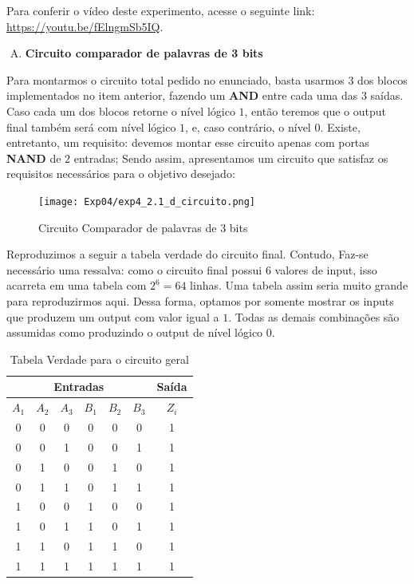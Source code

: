 \documentclass[12pt]{article}
\begin{document}
Para conferir o vídeo deste experimento, acesse o seguinte link:
\href{https://youtu.be/fElngmSb5IQ}{https://youtu.be/fElngmSb5IQ}.

\begin{enumerate}[D)]
\item \textbf{Circuito comparador de palavras de 3 bits}
\end{enumerate}

Para montarmos o circuito total pedido no enunciado, basta usarmos $3$ dos
blocos implementados no item anterior, fazendo um \textbf{AND} entre cada uma
das $3$ saídas. Caso cada um dos blocos retorne o nível lógico $1$, então
teremos que o output final também será com nível lógico $1$, e, caso contrário,
o nível $0$. Existe, entretanto, um requisito: devemos montar esse circuito
apenas com portas \textbf{NAND} de $2$ entradas; Sendo assim, apresentamos um
circuito que satisfaz os requisitos necessários para o objetivo desejado:

\begin{figure}[H]
    \centering
    \texttt{[image: Exp04/exp4\_2.1\_d\_circuito.png]}
    \caption{Circuito Comparador de palavras de 3 bits}\label{fig:exp4_2.1_d_circuito.png}
\end{figure}

Reproduzimos a seguir a tabela verdade do circuito final. Contudo, Faz-se
necessário uma ressalva: como o circuito final possui $6$ valores de input, isso
acarreta em uma tabela com $2^{6} = 64$ linhas. Uma tabela assim seria muito
grande para reproduzirmos aqui. Dessa forma, optamos por somente mostrar os
inputs que produzem um output com valor igual a $1$. Todas as demais combinações
são assumidas como produzindo o output de nível lógico $0$.

\begin{table}[H]
    \centering
    \caption{Tabela Verdade para o circuito geral}
    \begin{tabular}{|c|c|c|c|c|c|c|}\hline
    \multicolumn{6}{|c|}{Entradas} & \multicolumn{1}{|c|}{Saída} \\\hline
    $A_{1}$ & $A_{2}$ & $A_{3}$ & $B_{1}$ & $B_{2}$ & $B_{3}$ & $Z_{i}$ \\\hline
    0 & 0 & 0 & 0 & 0 & 0 & 1 \\\hline
    0 & 0 & 1 & 0 & 0 & 1 & 1 \\\hline
    0 & 1 & 0 & 0 & 1 & 0 & 1 \\\hline
    0 & 1 & 1 & 0 & 1 & 1 & 1 \\\hline
    1 & 0 & 0 & 1 & 0 & 0 & 1 \\\hline
    1 & 0 & 1 & 1 & 0 & 1 & 1 \\\hline
    1 & 1 & 0 & 1 & 1 & 0 & 1 \\\hline
    1 & 1 & 1 & 1 & 1 & 1 & 1 \\\hline
    \end{tabular}\label{tab:comparador_de_palavras_3_bits}
\end{table}
\end{document}
